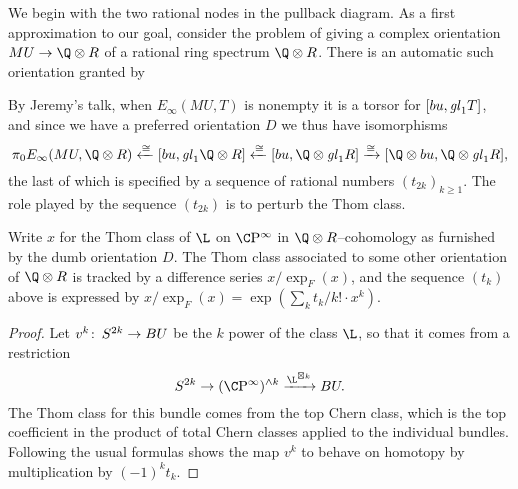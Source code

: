 We begin with the two rational nodes in the pullback diagram.  As a first approximation to our goal, consider the problem of giving a complex orientation $MU \to \Q \otimes R$ of a rational ring spectrum $\Q \otimes R$.  There is an automatic such orientation granted by
\begin{center}
\end{center}
By Jeremy's talk, when $E_\infty(MU, T)$ is nonempty it is a torsor for $[bu, \mathit{gl}_1 T]$, and since we have a preferred orientation $D$ we thus have isomorphisms \[\pi_0 E_\infty(MU, \Q \otimes R) \xleftarrow{\cong} [bu, \gl_1 \Q \otimes R] \xleftarrow{\cong} [bu, \Q \otimes \gl_1 R] \xrightarrow{\cong} [\Q \otimes bu, \Q \otimes \gl_1 R],\] the last of which is specified by a sequence of rational numbers $(t_{2k})_{k \ge 1}$.  The role played by the sequence $(t_{2k})$ is to perturb the Thom class.

\begin{proposition}
Write $x$ for the Thom class of $\L$ on $\CP^\infty$ in $\Q \otimes R$--cohomology as furnished by the dumb orientation $D$.  The Thom class associated to some other orientation of $\Q \otimes R$ is tracked by a difference series $x / \exp_F(x)$, and the sequence $(t_k)$ above is expressed by $x / \exp_F(x) = \exp(\sum_k t_k/k! \cdot x^k)$.
\end{proposition}
\begin{proof}
Let $v^k\colon\thinspace S^{2k} \to BU$ be the $k${\th} power of the class $\L$, so that it comes from a restriction \[S^{2k} \to (\CP^\infty)^{\sm k} \xrightarrow{\L^{\boxtimes k}} BU.\]  The Thom class for this bundle comes from the top Chern class, which is the top coefficient in the product of total Chern classes applied to the individual bundles.  Following the usual formulas shows the map $v^k$ to behave on homotopy by multiplication by $(-1)^k t_k$.
\end{proof}

